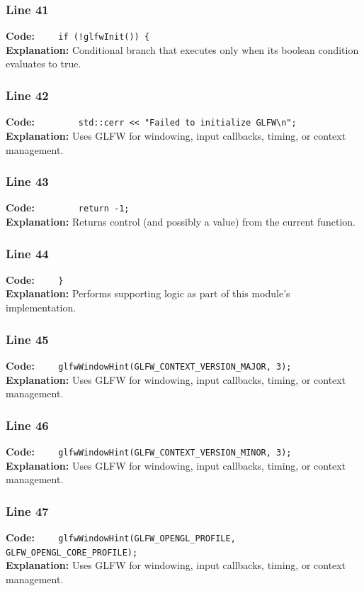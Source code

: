 \documentclass[11pt,a4paper]{article}
\begin{document}
\subsubsection*{Line 41}
\textbf{Code:} \verb|    if (!glfwInit()) {|\\
\textbf{Explanation:} Conditional branch that executes only when its boolean condition evaluates to true.

\subsubsection*{Line 42}
\textbf{Code:} \verb|        std::cerr << "Failed to initialize GLFW\n";|\\
\textbf{Explanation:} Uses GLFW for windowing, input callbacks, timing, or context management.

\subsubsection*{Line 43}
\textbf{Code:} \verb|        return -1;|\\
\textbf{Explanation:} Returns control (and possibly a value) from the current function.

\subsubsection*{Line 44}
\textbf{Code:} \verb|    }|\\
\textbf{Explanation:} Performs supporting logic as part of this module's implementation.

\subsubsection*{Line 45}
\textbf{Code:} \verb|    glfwWindowHint(GLFW_CONTEXT_VERSION_MAJOR, 3);|\\
\textbf{Explanation:} Uses GLFW for windowing, input callbacks, timing, or context management.

\subsubsection*{Line 46}
\textbf{Code:} \verb|    glfwWindowHint(GLFW_CONTEXT_VERSION_MINOR, 3);|\\
\textbf{Explanation:} Uses GLFW for windowing, input callbacks, timing, or context management.

\subsubsection*{Line 47}
\textbf{Code:} \verb|    glfwWindowHint(GLFW_OPENGL_PROFILE, GLFW_OPENGL_CORE_PROFILE);|\\
\textbf{Explanation:} Uses GLFW for windowing, input callbacks, timing, or context management.
\end{document}
